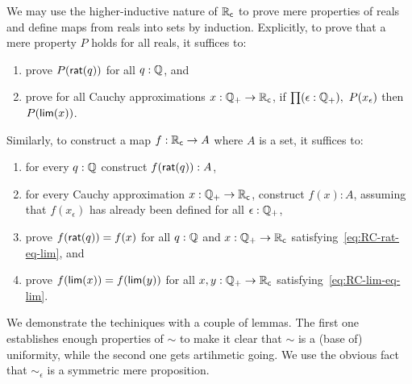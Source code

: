 We may use the higher-inductive nature of $\mathbb{R}_\mathsf{c}$ to prove mere properties of reals and
define maps from reals into sets by induction. Explicitly, to prove that a mere property
$P$ holds for all reals, it suffices to:
%
\begin{enumerate}
\item prove $P(\mathsf{rat}(q))$ for all $q : \mathbb{Q}$, and
\item prove for all Cauchy approximations $x : \mathbb{Q}_{+} \to \mathbb{R}_\mathsf{c}$, if $\prd{\epsilon : \Qp}
  P(x_\epsilon)$ then $P(\mathsf{lim}(x))$.
\end{enumerate}
%
Similarly, to construct a map $f : \mathbb{R}_\mathsf{c} \to A$ where $A$ is a set, it suffices to:
%
\begin{enumerate}
\item for every $q : \mathbb{Q}$ construct $f(\mathsf{rat}(q)) : A$,
\item for every Cauchy approximation $x : \mathbb{Q}_{+} \to \mathbb{R}_\mathsf{c}$, construct $f(x) : A$,
  assuming that $f(x_\epsilon)$ has already been defined for all $\epsilon : \mathbb{Q}_{+}$,
\item prove $f(\mathsf{rat}(q)) = f(x)$ for all $q : \mathbb{Q}$ and $x : \mathbb{Q}_{+} \to \mathbb{R}_\mathsf{c}$
  satisfying~\eqref{eq:RC-rat-eq-lim}, and
\item prove $f(\mathsf{lim}(x)) = f(\mathsf{lim}(y))$ for all $x, y : \mathbb{Q}_{+} \to \mathbb{R}_\mathsf{c}$
  satisfying~\eqref{eq:RC-lim-eq-lim}.
\end{enumerate}
%
We demonstrate the techiniques with a couple of lemmas. The first one establishes enough
properties of $\sim$ to make it clear that $\sim$ is a (base of) uniformity, while the
second one gets artihmetic going. We use the obvious fact that $\sim_\epsilon$ is a
symmetric mere proposition.

